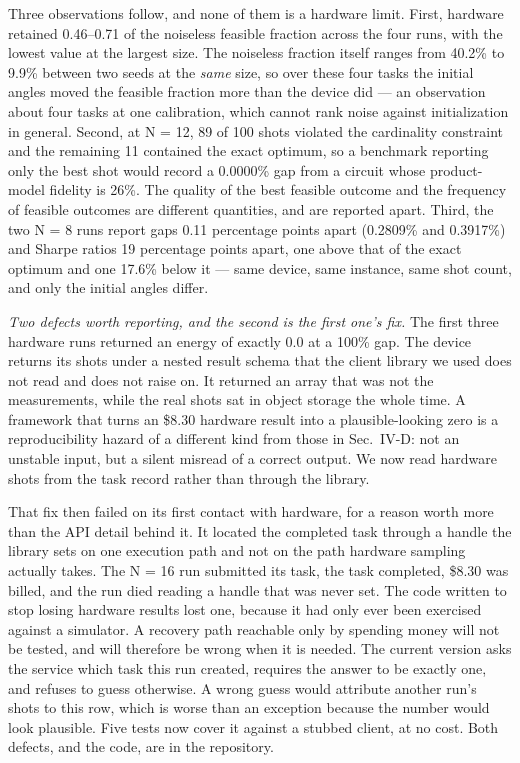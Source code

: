 \documentclass[journal]{IEEEtran}
\begin{document}
Three observations follow, and none of them is a hardware limit. First, hardware retained 0.46--0.71 of the noiseless feasible fraction across the four runs, with the lowest value at the largest size. The noiseless fraction itself ranges from 40.2\% to 9.9\% between two seeds at the \textit{same} size, so over these four tasks the initial angles moved the feasible fraction more than the device did --- an observation about four tasks at one calibration, which cannot rank noise against initialization in general. Second, at N = 12, 89 of 100 shots violated the cardinality constraint and the remaining 11 contained the exact optimum, so a benchmark reporting only the best shot would record a 0.0000\% gap from a circuit whose product-model fidelity is 26\%. The quality of the best feasible outcome and the frequency of feasible outcomes are different quantities, and are reported apart. Third, the two N = 8 runs report gaps 0.11 percentage points apart (0.2809\% and 0.3917\%) and Sharpe ratios 19 percentage points apart, one above that of the exact optimum and one 17.6\% below it --- same device, same instance, same shot count, and only the initial angles differ.


\textit{Two defects worth reporting, and the second is the first one's fix.} The first three hardware runs returned an energy of exactly 0.0 at a 100\% gap. The device returns its shots under a nested result schema that the client library we used does not read and does not raise on. It returned an array that was not the measurements, while the real shots sat in object storage the whole time. A framework that turns an \$8.30 hardware result into a plausible-looking zero is a reproducibility hazard of a different kind from those in Sec.~IV-D: not an unstable input, but a silent misread of a correct output. We now read hardware shots from the task record rather than through the library.


That fix then failed on its first contact with hardware, for a reason worth more than the API detail behind it. It located the completed task through a handle the library sets on one execution path and not on the path hardware sampling actually takes. The N = 16 run submitted its task, the task completed, \$8.30 was billed, and the run died reading a handle that was never set. The code written to stop losing hardware results lost one, because it had only ever been exercised against a simulator. A recovery path reachable only by spending money will not be tested, and will therefore be wrong when it is needed. The current version asks the service which task this run created, requires the answer to be exactly one, and refuses to guess otherwise. A wrong guess would attribute another run's shots to this row, which is worse than an exception because the number would look plausible. Five tests now cover it against a stubbed client, at no cost. Both defects, and the code, are in the repository.
\end{document}
